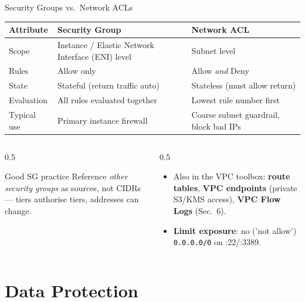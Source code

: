 \documentclass[aspectratio=169,10pt]{beamer}
\newcommand{\term}[1]{{\color{awsink}\textbf{#1}}}
\begin{document}
\begin{frame}{Security Groups vs.\ Network ACLs}
  \centering\small
  \renewcommand{\arraystretch}{1.3}
  \begin{tabular}{l l l}
    \toprule
    \textbf{Attribute} & \textbf{Security Group} & \textbf{Network ACL}\\
    \midrule
    Scope        & Instance / Elastic Network Interface (ENI) level            & Subnet level\\
    Rules        & Allow only                      & Allow \emph{and} Deny\\
    State        & Stateful (return traffic auto)  & Stateless (must allow return)\\
    Evaluation   & All rules evaluated together    & Lowest rule number first\\
    Typical use  & Primary instance firewall       & Coarse subnet guardrail, block bad IPs\\
    \bottomrule
  \end{tabular}
  \vfill
  \begin{columns}[T]
    \begin{column}{0.5\textwidth}\footnotesize
      \begin{block}{\footnotesize Good SG practice}
        \footnotesize Reference \emph{other security groups} as sources, not CIDRs ---
        tiers authorise tiers, addresses can change.
      \end{block}
    \end{column}
    \begin{column}{0.5\textwidth}\footnotesize
      \begin{itemize}
        \item Also in the VPC toolbox: \term{route tables}, \term{VPC endpoints}
              (private S3/KMS access), \term{VPC Flow Logs} (Sec.~6).
        \item \term{Limit exposure}: no ('not allow') \texttt{0.0.0.0/0} on :22/:3389.
      \end{itemize}
    \end{column}
  \end{columns}
\end{frame}

\section{Data Protection}
\end{document}
